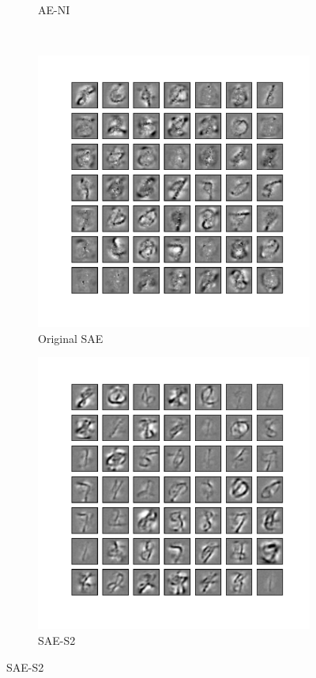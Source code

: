\begin{figure}
\begin{subfigure}[t]{0.4\textwidth}
		\caption{AE-NI}
	\end{subfigure}\\
	\begin{subfigure}[t]{0.4\textwidth}
		\includegraphics[width=\textwidth]{pics_sdlm/40_MNIST_SAE_original/2_60000_0.pdf}
		\caption{Original SAE}
	\end{subfigure}
	\begin{subfigure}[t]{0.4\textwidth}
		\includegraphics[width=\textwidth]{pics_sdlm/42_MNIST_SAE_noise/2_60000_0.pdf}
		\caption{SAE-S2}
		

\end{subfigure}
\end{figure}
